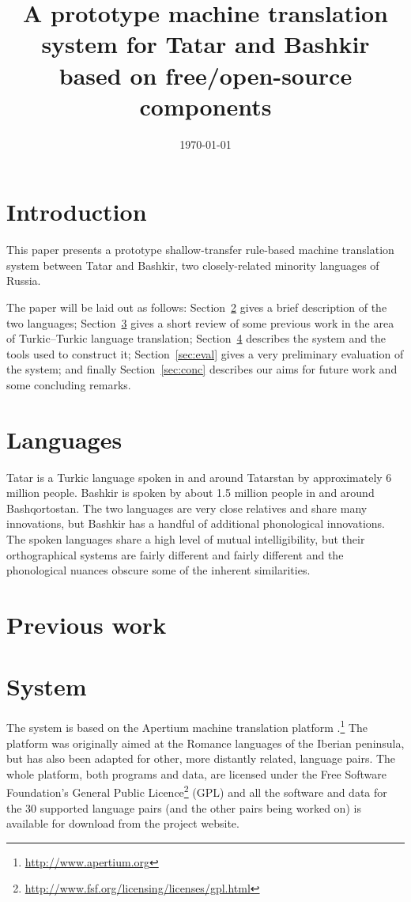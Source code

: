 \documentclass[11pt,a4paper]{article}
\title{A prototype machine translation system for Tatar and Bashkir based on 
   free/open-source components}
\date{\today}
\begin{document}
\maketitleabstract

\section{Introduction}

This paper presents a prototype shallow-transfer rule-based machine translation
system between Tatar and Bashkir, two closely-related minority languages of Russia.

The paper will be laid out as follows: Section~\ref{sec:lang} gives a brief description
of the two languages; Section~\ref{sec:prev} gives a short review of some previous
work in the area of Turkic--Turkic language translation; Section~\ref{sec:sys} 
describes the system and the tools used to construct it; Section~\ref{sec:eval}
gives a very preliminary evaluation of the system; and finally Section~\ref{sec:conc}
describes our aims for future work and some concluding remarks.

\section{Languages}
\label{sec:lang}

Tatar is a Turkic language spoken in and around Tatarstan by approximately 6 million people.  
Bashkir is spoken by about 1.5 million people in and around Bashqortostan.  The two languages 
are very close relatives and share many innovations, but Bashkir has a handful of additional 
phonological innovations.  The spoken languages share a high level of mutual intelligibility, 
but their orthographical systems are fairly different and fairly different and the phonological 
nuances obscure some of the inherent similarities.


\cite{usmanova06}

\section{Previous work}
\label{sec:prev}



\section{System}
\label{sec:sys}

The system is based on the Apertium machine translation platform \cite{apertium/2011}.\footnote{\url{http://www.apertium.org}} The 
platform was originally aimed at the Romance languages of the Iberian peninsula, but has also been adapted for 
other, more distantly related, language pairs.
The whole platform, both programs and data, are licensed under the Free Software Foundation's General Public 
Licence\footnote{\url{http://www.fsf.org/licensing/licenses/gpl.html}} (GPL) and all the software and data for the 
30 supported language pairs (and the other pairs being worked on) is available for download from the project 
website.
\end{document}
